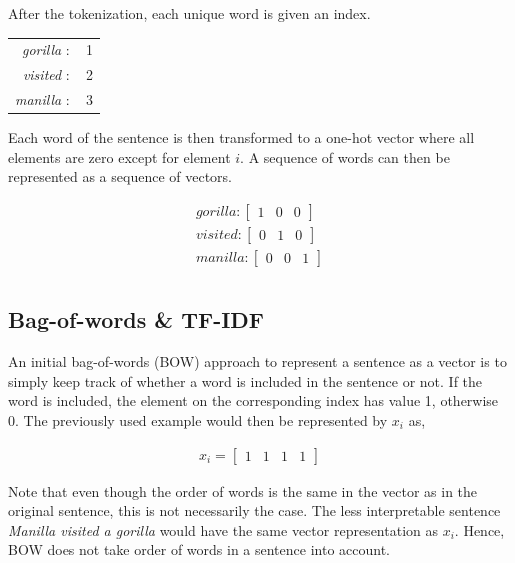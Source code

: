 After the tokenization, each unique word is given an index. 

\begin{center}
    \begin{tabular}{rc}
        \textit{gorilla} $:$ & 1 \\
        \textit{visited} $:$ & 2 \\
        \textit{manilla} $:$ & 3 \\
    \end{tabular}
\end{center}

Each word of the sentence is then transformed to a one-hot vector where all elements are zero except for element $i$. A sequence of words can then be represented as a sequence of vectors. 

\begin{align*}
    \textit{gorilla} : \begin{bmatrix}
    1 & 0 & 0 
    \end{bmatrix} \\
    \textit{visited} : \begin{bmatrix}
    0 & 1 & 0 
    \end{bmatrix} \\
    \textit{manilla} : \begin{bmatrix}
    0 & 0 & 1 
    \end{bmatrix} \\
\end{align*}


\subsection{Bag-of-words \& TF-IDF}

An initial bag-of-words (BOW) approach to represent a sentence as a vector is to simply keep track of whether a word is included in the sentence or not. If the word is included, the element on the corresponding index has value 1, otherwise 0. The previously used example would then be represented by $x_i$ as, 


\begin{align*}
    x_i = \begin{bmatrix}
    1 & 1 & 1 & 1
    \end{bmatrix}
\end{align*}

Note that even though the order of words is the same in the vector as in the original sentence, this is not necessarily the case. The less interpretable sentence \textit{Manilla visited a gorilla} would have the same vector representation as $x_i$. Hence, BOW does not take order of words in a sentence into account. 

